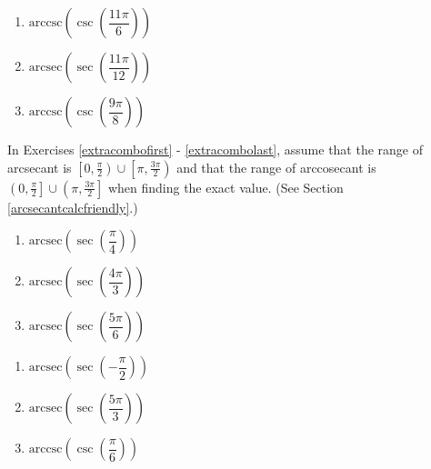\begin{multicols}{3}

\begin{enumerate}

\setcounter{enumi}{\value{HW}}

\item  $\text{arccsc}\left(\csc\left(\dfrac{11\pi}{6}\right) \right)$ 
\item  $\text{arcsec}\left(\sec\left(\dfrac{11\pi}{12}\right) \right)$
\item  $\text{arccsc}\left(\csc\left(\dfrac{9\pi}{8}\right) \right)$ \label{moreextracombolast}

\setcounter{HW}{\value{enumi}}

\end{enumerate}

\end{multicols}


In Exercises \ref{extracombofirst} - \ref{extracombolast}, assume that the range of arcsecant is $\left[0, \frac{\pi}{2} \right) \cup \left[\pi, \frac{3\pi}{2} \right)$ and that the range of arccosecant is $\left(0, \frac{\pi}{2} \right] \cup \left( \pi, \frac{3\pi}{2} \right]$ when finding the exact value. (See Section \ref{arcsecantcalcfriendly}.)


\begin{multicols}{3}

\begin{enumerate}

\setcounter{enumi}{\value{HW}}

\item  $\text{arcsec}\left(\sec\left(\dfrac{\pi}{4}\right) \right)$  \label{extracombofirst}
\item  $\text{arcsec}\left(\sec\left(\dfrac{4\pi}{3}\right) \right)$
\item  $\text{arcsec}\left(\sec\left( \dfrac{5\pi}{6} \right) \right)$

\setcounter{HW}{\value{enumi}}

\end{enumerate}

\end{multicols}

\begin{multicols}{3}

\begin{enumerate}

\setcounter{enumi}{\value{HW}}

\item  $\text{arcsec}\left(\sec\left(-\dfrac{\pi}{2} \right) \right)$ 
\item  $\text{arcsec}\left(\sec\left(\dfrac{5\pi}{3}\right) \right)$
\item  $\text{arccsc}\left(\csc\left(\dfrac{\pi}{6}\right) \right)$ 

\setcounter{HW}{\value{enumi}}

\end{enumerate}

\end{multicols}

